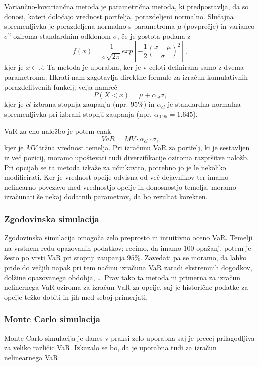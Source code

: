 \documentclass[a4paper, 12pt]{article}
\theoremstyle{definition}
\theoremstyle{plain}
\newcommand{\R}{\mathbb R}
\begin{document}
Variančno-kovariančna metoda je parametrična metoda, ki predpostavlja, da so donosi, 
kateri določajo vrednost portfelja,
porazdeljeni normalno. Slučajna spremenljivka je porazdeljena normalno s parametroma $\mu$ (povprečje)
in varianco $\sigma^2$ oziroma standardnim odklonom $\sigma$, če je gostota podana z 
\begin{equation}
    f(x) = \frac{1}{\sigma\sqrt{2\pi}}exp[-\frac{1}{2}(\frac{x-\mu}{\sigma})^2],
\end{equation}
kjer je $x\in \R$. Ta metoda je uporabna, ker je v celoti definirana samo z dvema parametroma. 
Hkrati nam zagotavlja direktne formule za izračun kumulativnih porazdelitvenih funkcij; velja namreč
\begin{equation}
    P(X<x) = \mu + \alpha_{cl}\sigma,
\end{equation}
kjer je $cl$ izbrana stopnja zaupanja (npr. $95\%$) in $\alpha_{cl}$ je standardna normalna spremenljivka pri izbrani stopnji zaupanja
(npr. $\alpha_{0.95}=1.645$). 

VaR za eno naložbo je potem enak
\begin{equation}
    VaR = MV\cdot \alpha_{cl} \cdot \sigma,
\end{equation}
kjer je $MV$ tržna vrednost temelja. Pri izračunu VaR za portfelj, ki je sestavljen iz več pozicij,
moramo upoštevati tudi diverzifikacije oziroma razpršitve naložb.
Pri opcijah se ta metoda izkaže za učinkovito, potrebno jo je le nekoliko modificirati. Ker je vrednost opcije odvisna od več dejavnikov 
ter imamo nelinearno povezavo med vrednostjo opcije in donosnostjo temelja, moramo izračunati še nekaj dodatnih parametrov, da bo rezultat korekten.

\subsubsection{Zgodovinska simulacija}
Zgodovinska simulacija omogoča zelo preprosto in intuitivno oceno VaR. Temelji na vrstnem redu opazovanih podatkov;
recimo, da imamo $100$ opažanj, potem je šesto po vrsti VaR pri stopnji zaupanja $95\%$. 
Zavedati pa se moramo, da lahko pride do večjih napak pri tem načinu izračuna VaR zaradi ekstremnih dogodkov, dolžine opazovanega obdobja, \dots
Prav tako ta metoda ni primerna za izračun nelinernega VaR oziroma 
za izračun VaR za opcije, saj je historične podatke za opcije težko dobiti in jih med seboj primerjati.

\subsubsection{Monte Carlo simulacija}
Monte Carlo simulacija je danes v praksi zelo uporabna saj je precej prilagodljiva za veliko različic VaR. 
Izkazalo se bo, da je uporabna tudi za izračun nelinearnega VaR.
\end{document}
